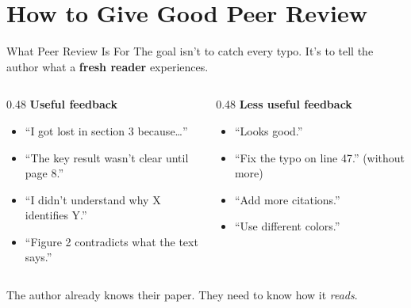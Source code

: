 \section{How to Give Good Peer Review}

\begin{frame}{What Peer Review Is For}
  \small
  The goal isn't to catch every typo. It's to tell the author what a \textbf{fresh reader} experiences.

  \vspace{6pt}

  \begin{columns}[T]
    \begin{column}{0.48\textwidth}
      \textbf{\textcolor{usfgreen}{Useful feedback}}
      \begin{itemize}\setlength\itemsep{1pt}
        \item ``I got lost in section 3 because\ldots''
        \item ``The key result wasn't clear until page 8.''
        \item ``I didn't understand why X identifies Y.''
        \item ``Figure 2 contradicts what the text says.''
      \end{itemize}
    \end{column}
    \begin{column}{0.48\textwidth}
      \textbf{\textcolor{red!60}{Less useful feedback}}
      \begin{itemize}\setlength\itemsep{1pt}
        \item ``Looks good.''
        \item ``Fix the typo on line 47.'' (without more)
        \item ``Add more citations.''
        \item ``Use different colors.''
      \end{itemize}
    \end{column}
  \end{columns}

  \vspace{6pt}

  The author already knows their paper. They need to know how it \emph{reads}.
\end{frame}

